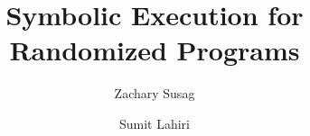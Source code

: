 \documentclass[acmsmall,review,anonymous]{acmart}\settopmatter{printfolios=true,printccs=false,printacmref=false}
\begin{document}
\title{Symbolic Execution for Randomized Programs}         %




\author{Zachary Susag}

\author{Sumit Lahiri}
\end{document}
